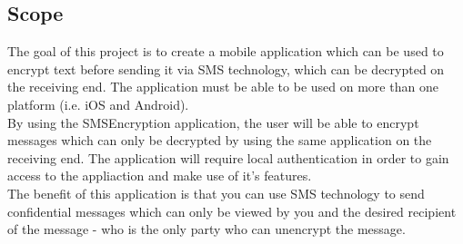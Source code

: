 \subsection{Scope}
The goal of this project is to create a mobile application which can be used to encrypt text before sending it via SMS technology, which can be decrypted on the receiving end. The application must be able to be used on more than one platform (i.e. iOS and Android).
\vspace{10pt}\\
By using the SMSEncryption application, the user will be able to encrypt messages which can only be decrypted by using the same application on the receiving end. The application will require local authentication in order to gain access to the appliaction and make use of it's features.
\vspace{10pt}\\
The benefit of this application is that you can use SMS technology to send confidential messages which can only be viewed by you and the desired recipient of the message - who is the only party who can unencrypt the message.

